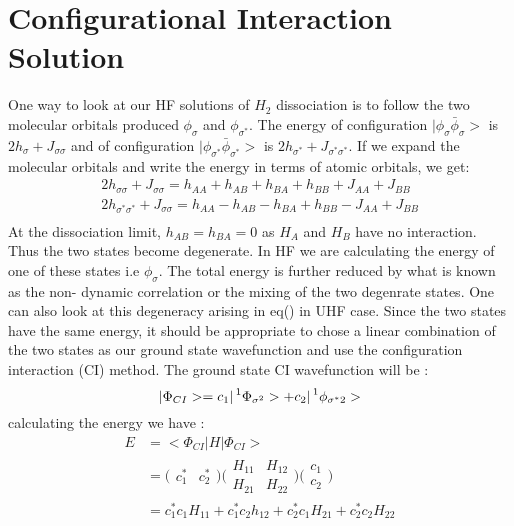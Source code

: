 \documentclass[11pt]{article}   	%
\begin{document}
\section{Configurational Interaction Solution}
	One way to look at our HF solutions of $H_2$ dissociation is to follow the two molecular orbitals produced $\phi_{\sigma}$ and $\phi_{\sigma^*}$. 
	The energy of configuration $|\phi_{\sigma} \bar{\phi}_{\sigma}>$ is $2h_{\sigma} +J_{\sigma \sigma}$ and of configuration 
	$|\phi_{\sigma^*} \bar{\phi}_{\sigma^*}>$ is $2h_{\sigma^*} +J_{\sigma^* \sigma^*}$. If we expand the molecular orbitals and 
	write the energy in terms of atomic orbitals, we get:\\
	\begin{equation}
	\begin{split}
	2h_{\sigma \sigma} +J_{\sigma \sigma}=h_{AA}+h_{AB}+h_{BA}+h_{BB}+J_{AA}+J_{BB}\\
	2h_{\sigma^* \sigma^*} +J_{\sigma \sigma}=h_{AA}-h_{AB}-h_{BA}+h_{BB}-J_{AA}+J_{BB}\\
	\end{split}
	\end{equation}
	At the dissociation limit, $h_{AB}=h_{BA}=0$ as $H_A$ and $H_B$ have no interaction. 
	Thus the two states become degenerate. In HF we are calculating the energy of one of these 
	states i.e $\phi_{\sigma}$. The total energy is further reduced by what is known as the non-
	dynamic correlation or the mixing of the two degenrate states. 
	One can also look at this degeneracy arising in eq() in UHF case. 
	Since the two states have the same energy, it should be appropriate to chose a linear 
	combination of the two states as our ground state wavefunction and use the configuration 
	interaction (CI) method. The ground state CI wavefunction will be :\\
	\begin{equation}
		|\Phi_{CI}>=c_1|\prescript{1}{}{\Phi_{\sigma^2}}>+c_2|\prescript{1}{}{\phi_{\sigma^*2}}>
	\end{equation}
	calculating the energy we have :\\
	\begin{equation}
	\begin{split}
		E&=<\Phi_{CI}|H|\Phi_{CI}>\\
		 &=\big( \begin{matrix} c_1^* & c_2^* \end{matrix} \big)\bigg(\begin{matrix} H_{11} & H_{12} \\ H_{21} & H_{22} \end{matrix}\bigg)
			 \bigg( \begin{matrix} c_1\\c_2\end{matrix}\bigg)\\
		 &=c_1^*c_1H_{11}+c_1^*c_2h_{12}+c_2^*c_1H_{21}+c_2^*c_2H_{22}\\
	\end{split}
	\end{equation}
\end{document}
